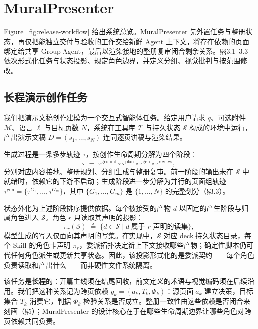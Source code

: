 
\section{MuralPresenter}

Figure~\ref{fig:release-workflow} 给出系统总览。MuralPresenter 先外置任务与整册状态，再仅把能独立交付与验收的工作交给新鲜 Agent 上下文，将存在依赖的页面绑定给共享 Group Agent，最后以渲染接地的整册复审闭合剩余关系。§§3.1–3.3 依次形式化任务与状态投影、规定角色边界，并定义分组、视觉批判与按范围修改。

\subsection{长程演示创作任务}

我们把演示文稿创作建模为一个交互式智能体任务。给定用户请求 \(q\)、可选附件 \(\mathcal{M}\)、语言 \(\ell\) 与目标页数 \(N\)，系统在工具库 \(\mathcal{T}\) 与持久状态 \(\mathcal{S}\) 构成的环境中运行，产出演示文稿 \(D=(s_1,\ldots,s_N)\) 连同逐页讲稿与渲染结果。

生成过程是一条多步轨迹 \(\tau\)，按创作生命周期分解为四个阶段： \[
\tau \;=\; \tau^{\mathrm{ground}} \circ \tau^{\mathrm{plan}} \circ \tau^{\mathrm{gen}} \circ \tau^{\mathrm{review}},
\] 分别对应内容接地、整册规划、分组生成与整册复审。前一阶段的输出未在 \(\mathcal{S}\) 中就绪时，依赖它的下游不启动；生成阶段进一步分解为并行的页面组轨迹 \(\tau^{\mathrm{gen}}=\{\tau^{G_1},\ldots,\tau^{G_m}\}\)，其中 \(\{G_1,\ldots,G_m\}\) 是 \(\{1,\ldots,N\}\) 的完整划分（§3.3）。

状态外化为上述阶段排序提供依据。每个被接受的产物 \(d\) 以固定的产生阶段与归属角色进入 \(\mathcal{S}\)。角色 \(r\) 只读取其声明的投影： \[
\pi_r(\mathcal{S}) \;\triangleq\; \{d \in \mathcal{S} \mid d \text{ 属于 } r\text{ 声明的读集}\},
\] 模型生成的写入仅面向其声明的写集。在实现中，\(\mathcal{S}\) 对应 deck 持久状态目录，每个 Skill 的角色卡声明 \(\pi_r\)，委派拓扑决定新上下文接收哪些产物；确定性脚本仍可代任何角色派生或更新共享状态。因此，该投影形式化的是委派契约——每个角色负责读取和产出什么——而非硬性文件系统隔离。

该任务是\textbf{长程}的：开篇主线须在结尾回收，前文定义的术语与视觉编码须在后续沿用。我们把这种关系记为跨页依赖 \(g_k=(a_k,T_k,\Phi_k)\)：源页面 \(a_k\) 建立决策，目标集合 \(T_k\) 消费它，判据 \(\Phi_k\) 检验关系是否成立。整册一致性由这些依赖是否闭合来刻画（§5）；MuralPresenter 的设计核心在于在哪些生命周期边界让哪些角色对跨页依赖共同负责。

